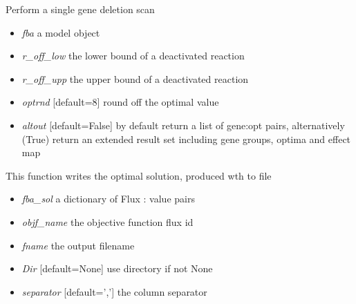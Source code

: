 \documentclass[a4paper,11pt,english]{sphinxmanual}
\begin{document}

\begin{fulllineitems}
\label{modules_doc:cbmpy.CBCPLEX.cplx_singleGeneScan}
Perform a single gene deletion scan
\begin{itemize}
\item {} 
\emph{fba} a model object

\item {} 
\emph{r\_off\_low} the lower bound of a deactivated reaction

\item {} 
\emph{r\_off\_upp} the upper bound of a deactivated reaction

\item {} 
\emph{optrnd} {[}default=8{]} round off the optimal value

\item {} 
\emph{altout} {[}default=False{]} by default return a list of gene:opt pairs, alternatively (True) return an extended result set including gene groups, optima and effect map

\end{itemize}

\end{fulllineitems}


\begin{fulllineitems}
\label{modules_doc:cbmpy.CBCPLEX.cplx_writeLPsolution}
This function writes the optimal solution, produced wth  to file
\begin{itemize}
\item {} 
\emph{fba\_sol} a dictionary of Flux : value pairs

\item {} 
\emph{objf\_name} the objective function flux id

\item {} 
\emph{fname} the output filename

\item {} 
\emph{Dir} {[}default=None{]} use directory if not None

\item {} 
\emph{separator} {[}default=','{]} the column separator

\end{itemize}

\end{fulllineitems}
\end{document}
